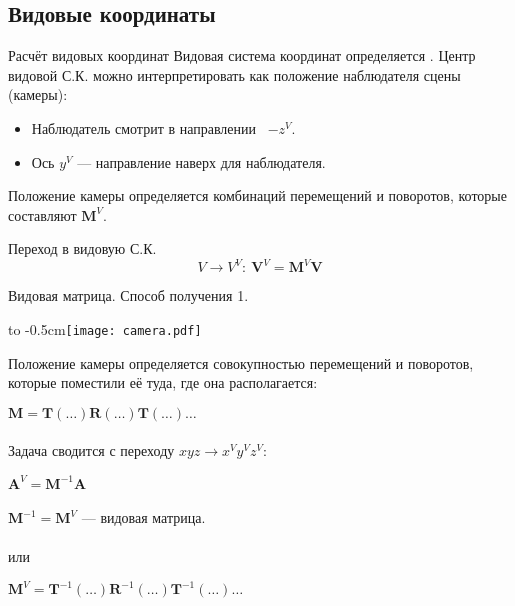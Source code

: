 \documentclass[10pt]{beamer}
\begin{document}
	\subsection{Видовые координаты}
	
	\begin{frame}{Расчёт видовых координат}
		Видовая система координат определяется . Центр видовой С.К. можно интерпретировать как положение наблюдателя сцены (камеры):
		 \begin{itemize}
		 	\item Наблюдатель смотрит в направлении \ $-z^V$.
		 	\item Ось $y^V$ --- направление наверх для наблюдателя.
		 \end{itemize}
		 
		 Положение камеры определяется комбинаций перемещений и поворотов, которые составляют $\mathbf M^V$. 
		 
		 \begin{block}{Переход в видовую С.К.}
		 	$$
		 	V \rightarrow V^V: \ \mathbf V^V = \mathbf M^V \mathbf V
		 	$$
		 \end{block}
		  
	\end{frame}
	
	
	\begin{frame} {Видовая матрица. Способ получения 1.}
		
		{
			\hbox to -0.5cm{}\texttt{[image: camera.pdf]}
		}
		{
			Положение камеры определяется совокупностью перемещений и поворотов, которые поместили её туда, где она располагается:
			
			$ \mathbf M = \mathbf T(\dots)\mathbf R(\dots)\mathbf T(\dots)\dots $ \\~\\
			
			Задача сводится с переходу $xyz \rightarrow x^Vy^Vz^V $:
			
			$\mathbf A^V = \mathbf M^{-1}\mathbf A$ \\ ~ \\
			
			$ \mathbf M^{-1} = \mathbf M^V$ --- видовая матрица. \\ ~ \\
			
			или
			
			$\mathbf M^V =  \mathbf T^{-1}(\dots)\mathbf R^{-1}(\dots)\mathbf T^{-1}(\dots)\dots  $
			
		}
	\end{frame}
	
\end{document}
